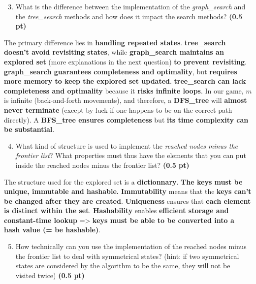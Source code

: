 \documentclass[11pt,a4paper]{report}
\begin{document}
\begin{enumerate}
\setcounter{enumi}{2}
    \item What is the difference between the implementation of the \textit{graph\_search} and the \textit{tree\_search} methods and how does it impact the search methods? \textbf{(0.5 pt)}
\end{enumerate}

\begin{answer}
The primary difference lies in \textbf{handling repeated states}.
\textbf{tree\_search doesn't avoid revisiting states}, while \textbf{graph\_search maintains an explored set} (more explanations in the next question) \textbf{to prevent revisiting}.
\textbf{graph\_search guarantees completeness and optimality}, but \textbf{requires more memory to keep the explored set updated}.
\textbf{tree\_search can lack completeness and optimality} because it \textbf{risks infinite loops}. In our game, $m$ is infinite (back-and-forth movements), and therefore, a \textbf{DFS\_tree} will \textbf{almost never terminate} (except by luck if one happens to be on the correct path directly). A \textbf{BFS\_tree ensures completeness} but \textbf{its time complexity can be substantial}.
\end{answer}



\begin{enumerate}
\setcounter{enumi}{3}
    \item What kind of structure is used to implement the \textit{reached nodes minus the frontier list}? What properties must thus have the elements that you can
	put inside the reached nodes minus the frontier list? \textbf{(0.5 pt)}
\end{enumerate}

\begin{answer}
The structure used for the explored set is a \textbf{dictionnary}. \textbf{The keys must be unique, immutable and hashable.}
\textbf{Immutability} means that the \textbf{keys can't be changed after they are created}.
\textbf{Uniqueness} ensures that \textbf{each element is distinct within the set}.
\textbf{Hashability} enables \textbf{efficient storage and constant-time lookup} => \textbf{keys must be able to be converted into a hash value (= be hashable)}.
\end{answer}



\begin{enumerate}
\setcounter{enumi}{4}
    \item How technically can you use the implementation of the reached nodes minus the frontier list to deal with symmetrical states? (hint: if two symmetrical states are considered by the algorithm to be the same, they will not be visited twice) \textbf{(0.5 pt)}
\end{enumerate}
\end{document}
